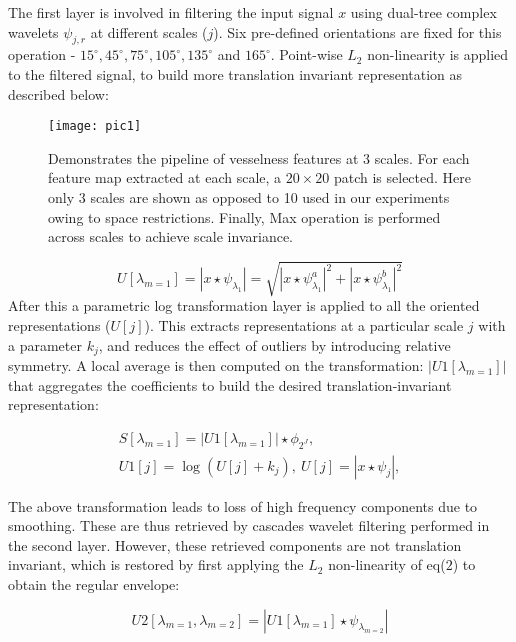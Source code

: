 \documentclass[10pt,twocolumn,letterpaper]{article}
\begin{document}
The first layer is involved in filtering the input signal $x$ using dual-tree complex wavelets $ \psi_{j,r }$ at different scales ($j$). Six pre-defined orientations are fixed for this operation -  $15^\circ, 45^\circ, 75^\circ, 105^\circ, 135^\circ$ and $165^\circ$. Point-wise $L_{2}$ non-linearity is applied to the filtered signal, to build more translation invariant representation as described below:

\begin{figure*}[t!]
	\centering
	\texttt{[image: pic1]}
	\caption{Demonstrates the pipeline of vesselness features at 3 scales. For each feature map extracted at each scale, a $20 \times 20$ patch is selected. Here only 3 scales are shown as opposed to 10 used in our experiments owing to space restrictions. Finally, Max operation is performed across scales to achieve scale invariance.}
	\label{fig:vesselness}
\end{figure*}

\begin{equation}
U[\lambda_{m = 1}] = |x\star \psi_{\lambda_{1} }| = \sqrt{|x\star \psi_{\lambda_{1} }^{a}|^2 + |x\star \psi_{\lambda_{1} }^{b}|^2} 
\end{equation}
After this a parametric log transformation layer is applied to all the oriented representations ($U[j]$). This extracts representations at a particular scale $j$ with a parameter $k_{j}$, and reduces the effect of outliers by introducing relative symmetry. A local average is then computed on the transformation: $|U1[\lambda_{m = 1}]|$ that aggregates the coefficients to build the desired translation-invariant representation:
  
\begin{equation}
\begin{aligned}
S[\lambda_{m = 1}] = |U1[\lambda_{m = 1}]| \star \phi_{2^J}, \\ U1[j] = \log(U[j] + k_{j}), \ U[j] = |x\star \psi_{j}|, 
\end{aligned}
\end{equation}

The above transformation leads to loss of high frequency components due to smoothing. These are thus retrieved by cascades wavelet filtering performed in the second layer. However, these retrieved components are not translation invariant, which is restored by first applying the $L_{2}$ non-linearity of eq($2$) to obtain the regular envelope:

\begin{equation}
U2[\lambda_{m = 1},\lambda_{m = 2}] = |U1[\lambda_{m = 1}] \star \psi_{\lambda_{m = 2}}|
\end{equation}
\end{document}
